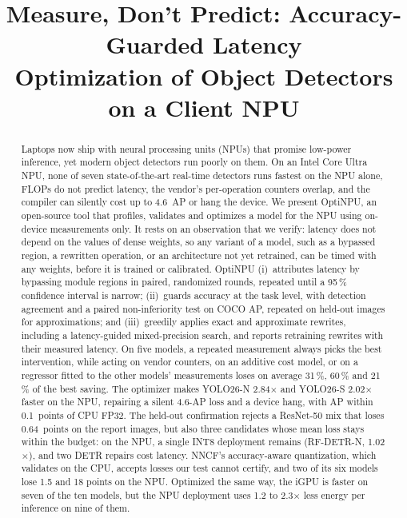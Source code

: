 \documentclass[conference]{IEEEtran}
\newcommand{\tool}{OptiNPU}
\begin{document}
\title{Measure, Don't Predict: Accuracy-Guarded Latency\\Optimization of Object Detectors on a Client NPU}

\author{
}

\maketitle

\begin{abstract}
Laptops now ship with neural processing units (NPUs) that promise low-power inference, yet modern object detectors run poorly on them. On an Intel Core Ultra NPU, none of seven state-of-the-art real-time detectors runs fastest on the NPU alone, FLOPs do not predict latency, the vendor's per-operation counters overlap, and the compiler can silently cost up to 4.6~AP or hang the device. We present \tool{}, an open-source tool that profiles, validates and optimizes a model for the NPU using on-device measurements only. It rests on an observation that we verify: latency does not depend on the values of dense weights, so any variant of a model, such as a bypassed region, a rewritten operation, or an architecture not yet retrained, can be timed with any weights, before it is trained or calibrated. \tool{} (i)~attributes latency by bypassing module regions in paired, randomized rounds, repeated until a 95\,\% confidence interval is narrow; (ii)~guards accuracy at the task level, with detection agreement and a paired non-inferiority test on COCO AP, repeated on held-out images for approximations; and (iii)~greedily applies exact and approximate rewrites, including a latency-guided mixed-precision search, and reports retraining rewrites with their measured latency. On five models, a repeated measurement always picks the best intervention, while acting on vendor counters, on an additive cost model, or on a regressor fitted to the other models' measurements loses on average 31\,\%, 60\,\% and 21\,\% of the best saving. The optimizer makes YOLO26-N 2.84$\times$ and YOLO26-S 2.02$\times$ faster on the NPU, repairing a silent 4.6-AP loss and a device hang, with AP within 0.1~points of CPU FP32. The held-out confirmation rejects a ResNet-50 mix that loses 0.64~points on the report images, but also three candidates whose mean loss stays within the budget: on the NPU, a single INT8 deployment remains (RF-DETR-N, 1.02$\times$), and two DETR repairs cost latency. NNCF's accuracy-aware quantization, which validates on the CPU, accepts losses our test cannot certify, and two of its six models lose 1.5 and 18 points on the NPU. Optimized the same way, the iGPU is faster on seven of the ten models, but the NPU deployment uses 1.2 to 2.3$\times$ less energy per inference on nine of them.
\end{abstract}
\end{document}
